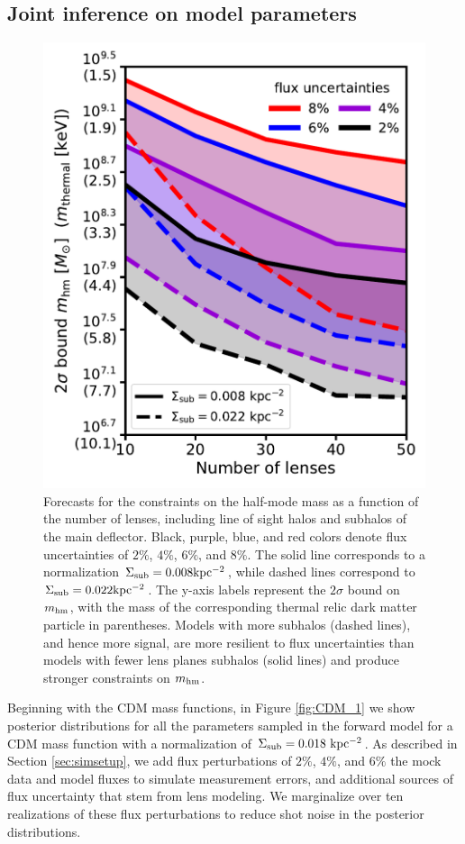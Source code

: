 \subsection{Joint inference on model parameters}
\label{ssec:inference}
\begin{figure}
	\centering
	\includegraphics[clip,trim=0cm 0cm 0cm
	0cm,width=.6\textwidth,keepaspectratio]{./figures_LOSforward/2sigma_mhm.pdf}
	\caption{\label{fig:2sigmamhm} Forecasts for the constraints on the half-mode mass as a function of the number of lenses, including line of sight halos and subhalos of the main deflector. Black, purple, blue, and red colors denote flux uncertainties of $2\%$, $4\%$, $6\%$, and $8\%$. The solid line corresponds to a normalization $\Sigma_{\rm{sub}} = 0.008 \rm{kpc^{-2}}$, while dashed lines correspond to $\Sigma_{\rm{sub}} = 0.022 \rm{kpc^{-2}}$. The y-axis labels represent the $2 \sigma$ bound on ${m_{\rm{hm}}}$, with the mass of the corresponding thermal relic dark matter particle in parentheses. Models with more subhalos (dashed lines), and hence more signal, are more resilient to flux uncertainties than models with fewer lens planes subhalos (solid lines) and produce stronger constraints on ${m_{\rm{hm}}}$. }
\end{figure}	
Beginning with the CDM mass functions, in Figure \ref{fig:CDM_1} we show posterior distributions for all the parameters sampled in the forward model for a CDM mass function with a normalization of $\Sigma_{\rm{sub}} = 0.018 \ \rm{kpc^{-2}}$. As described in Section \ref{sec:simsetup}, we add flux perturbations of $2 \%$, $4 \%$, and $6 \%$ the mock data and model fluxes to simulate measurement errors, and additional sources of flux uncertainty that stem from lens modeling. We marginalize over ten realizations of these flux perturbations to reduce shot noise in the posterior distributions. 

